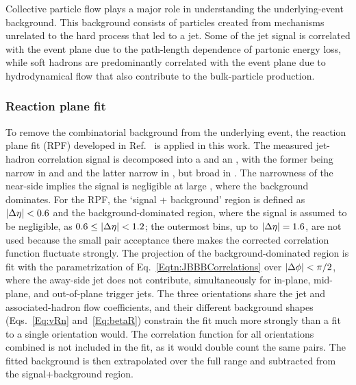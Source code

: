 
Collective particle flow plays a major role in understanding the underlying-event background.  This background consists of particles created from mechanisms unrelated to the hard process that led to a jet.  Some of the jet signal is correlated with the event plane due to the path-length dependence of partonic energy loss, while soft hadrons are predominantly correlated with the event plane due to hydrodynamical flow that also contribute to the bulk-particle production. 

\subsubsection{Reaction plane fit} \label{sect:RPF}
To remove the combinatorial background from the underlying event, the reaction plane fit (RPF) developed in Ref.~\cite{Sharma:2015qra} is applied in this work.
%
The measured jet-hadron correlation signal is decomposed into a \ns and an \as, with the former being narrow in \dphi and \deta and the latter narrow in \dphi, but broad in \deta.
%
The narrowness of the near-side implies the signal is negligible at large \deta, where the background dominates.
%
For the RPF, the `signal + background' region is defined as $|\Delta\eta| < 0.6$ and the background-dominated region, where the signal is assumed to be negligible, as $0.6 \leq |\Delta\eta| < 1.2$; the outermost \deta bins, up to $|\Delta\eta| = 1.6$, are not used because the small pair acceptance there makes the corrected correlation function fluctuate strongly.
%
The \dphi projection of the background-dominated region is fit with the parametrization of Eq.~\ref{Eqtn:JBBBCorrelations} over $|\Delta\phi|<\pi/2$, where the away-side jet does not contribute, simultaneously for in-plane, mid-plane, and out-of-plane trigger jets.
%
The three orientations share the jet and associated-hadron flow coefficients, and their different background shapes (Eqs.~\ref{Eq:vRn} and~\ref{Eq:betaR}) constrain the fit much more strongly than a fit to a single orientation would.
%
The correlation function for all orientations combined is not included in the fit, as it would double count the same pairs.
%
The fitted background is then extrapolated over the full \dphi range and subtracted from the signal+background region.


